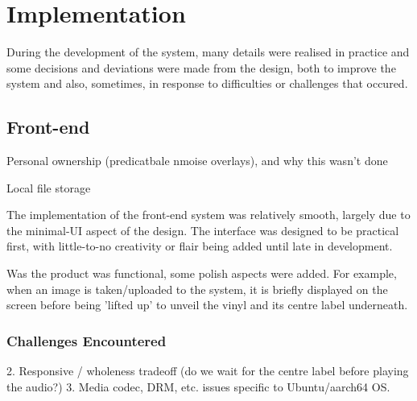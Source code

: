     \section{Implementation}
    
        During the development of the system, many details were realised in practice and some decisions and deviations were made from the design, both to improve the system and also, sometimes, in response to difficulties or challenges that occured.
    
        \subsection{Front-end}
    
            \begin{temp}
                Personal ownership (predicatbale nmoise overlays), and why this wasn't done
    
                Local file storage
            \end{temp}
    
            The implementation of the front-end system was relatively smooth, largely due to the minimal-UI aspect of the design. The interface was designed to be practical first, with little-to-no creativity or flair being added until late in development.
    
            Was the product was functional, some polish aspects were added. For example, when an image is taken/uploaded to the system, it is briefly displayed on the screen before being 'lifted up' to unveil the vinyl and its centre label underneath.
        
            \subsubsection{Challenges Encountered}
                \begin{temp}
                    2. Responsive / wholeness tradeoff (do we wait for the centre label before playing the audio?)
                    3. Media codec, DRM, etc. issues specific to Ubuntu/aarch64 OS.
                \end{temp}
    
